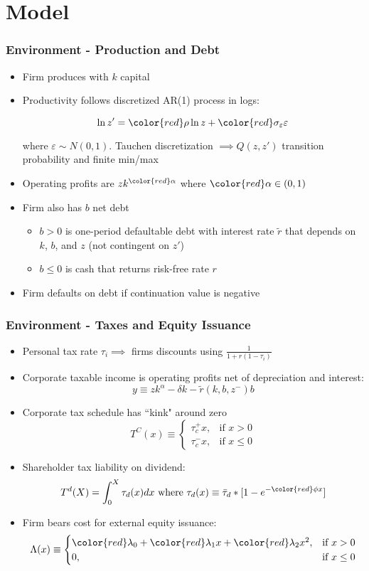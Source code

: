 \documentclass[usenames,dvipsnames, handout]{beamer}
\begin{document}
\section{Model}

\begin{frame}
\frametitle{Environment - Production and Debt}
\small
\begin{itemize}
\item Firm produces with $k$ capital
\item Productivity follows discretized AR(1) process in logs: 

$$
\ln z' = {\color{red}\rho} \ln z + {\color{red}\sigma_\varepsilon} \varepsilon
$$

where $\varepsilon \sim N(0, 1)$. Tauchen discretization $\implies Q(z, z')$ transition probability and finite min/max
\item Operating profits are $z k^{\color{red}\alpha}$ where ${\color{red}\alpha} \in (0, 1)$
\item Firm also has $b$ net debt
\begin{itemize}
\item $b > 0$ is one-period defaultable debt with interest rate $\tilde r$ that depends on $k$, $b$, and $z$ (not contingent on $z'$)
\item $b \le 0$ is cash that returns risk-free rate $r$
\end{itemize}

\item Firm defaults on debt if continuation value is negative
\end{itemize}
\end{frame}

\begin{frame}
\frametitle{Environment - Taxes and Equity Issuance}
\small
\begin{itemize}
\item Personal tax rate $\tau_i \implies$ firms discounts using $\frac{1}{1 + r(1-\tau_i)}$
\item Corporate taxable income is operating profits net of depreciation and interest:
$$
y \equiv z k^\alpha - \delta k - \tilde r(k, b, z^-) b
$$
\item Corporate tax schedule has ``kink" around zero
$$
T^C(x) \equiv 
\begin{cases} 
\tau_c^+ x, & \text{if }x > 0 \\
\tau_c^- x, & \text{if }x \le 0
\end{cases}
$$
\item Shareholder tax liability on dividend:
$$
T^d(X) = \int_0^X \tau_d(x) dx \text{ where } \tau_d(x) \equiv \bar \tau_d * [1 - e^{-{\color{red}\phi} x}]
$$
\item Firm bears cost for external equity issuance:
$$
\Lambda(x) \equiv 
\begin{cases} 
{\color{red}\lambda_0} + {\color{red}\lambda_1} x + {\color{red}\lambda_2} x^2, & \text{if }x > 0 \\
0, & \text{if }x \le 0
\end{cases}
$$
\end{itemize}
\end{frame}
\end{document}
